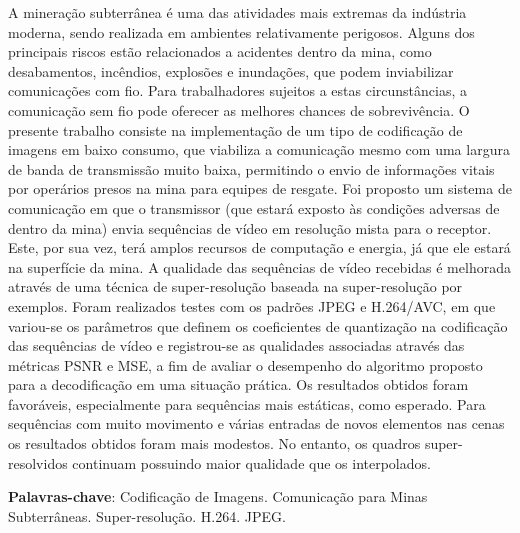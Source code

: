 \begin{resumo}

A mineração subterrânea é uma das atividades mais extremas da indústria moderna, sendo realizada em ambientes relativamente perigosos. Alguns dos principais riscos estão relacionados a acidentes dentro da mina, como desabamentos, incêndios, explosões e inundações, que podem inviabilizar comunicações com fio. Para trabalhadores sujeitos a estas circunstâncias, a  comunicação sem fio pode oferecer as melhores chances de sobrevivência. O presente trabalho consiste na implementação de um tipo de codificação de imagens em baixo consumo, que viabiliza a comunicação mesmo com uma largura de banda de transmissão muito baixa, permitindo o envio de informações vitais por operários presos na mina para equipes de resgate. Foi proposto um sistema de comunicação em que o transmissor (que  estará exposto às condições adversas de dentro da mina) envia sequências de vídeo em resolução mista para o receptor. Este, por sua vez, terá amplos recursos de computação e energia, já que ele estará na superfície da mina. A qualidade das sequências de vídeo recebidas é melhorada através de uma técnica de super-resolução baseada na super-resolução por exemplos. Foram realizados testes com os padrões JPEG e H.264/AVC, em que variou-se os parâmetros que definem os coeficientes de quantização na codificação das sequências de vídeo e registrou-se as qualidades associadas  através das métricas PSNR e MSE, a fim de avaliar o desempenho do algoritmo proposto para a decodificação em uma situação prática. Os resultados obtidos foram favoráveis, especialmente para sequências mais estáticas, como esperado. Para sequências com muito movimento e várias entradas de novos elementos nas cenas os resultados obtidos foram mais modestos. No entanto,  os quadros super-resolvidos continuam possuindo maior qualidade que os interpolados.

\vspace{\onelineskip}
    
 \noindent
 \textbf{Palavras-chave}: Codificação de Imagens. Comunicação para Minas Subterrâneas. Super-resolução. H.264. JPEG. 
\end{resumo}
